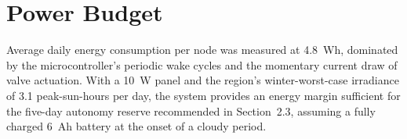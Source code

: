 \section{Power Budget}
Average daily energy consumption per node was measured at 4.8~Wh, dominated by the
microcontroller's periodic wake cycles and the momentary current draw of valve actuation. With
a 10~W panel and the region's winter-worst-case irradiance of 3.1 peak-sun-hours per day, the
system provides an energy margin sufficient for the five-day autonomy reserve recommended in
Section~2.3, assuming a fully charged 6~Ah battery at the onset of a cloudy period.
